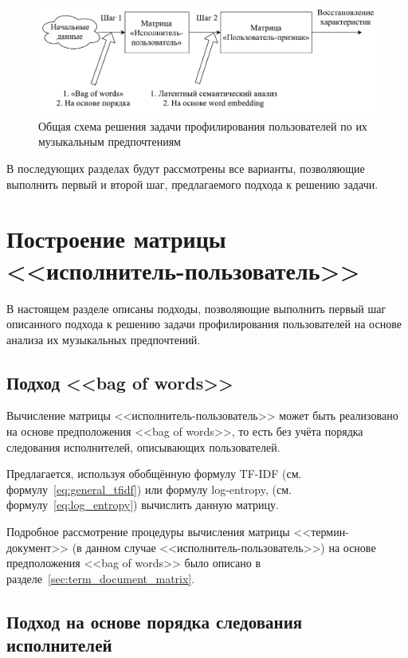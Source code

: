 \begin{figure}[!h]
\caption{Общая схема решения задачи профилирования пользователей
         по их музыкальным предпочтениям}
\label{fig:general_approach}
\centering
\includegraphics[width=\textwidth]{figs/general-approach.pdf}
\end{figure}

В последующих разделах будут рассмотрены все варианты,
позволяющие выполнить первый и второй шаг, предлагаемого
подхода к решению задачи.

\section{Построение матрицы <<исполнитель-пользователь>>}
\label{sec:step1_artist_user_matrix}

В настоящем разделе описаны подходы, позволяющие выполнить
первый шаг описанного подхода к решению задачи профилирования
пользователей на основе анализа их музыкальных предпочтений.

\subsection{Подход <<bag of words>>}

Вычисление матрицы <<исполнитель-пользователь>> может быть
реализовано на основе предположения <<bag of words>>, то есть
без учёта порядка следования исполнителей, описывающих пользователей.

Предлагается, используя обобщённую формулу TF-IDF 
(см. формулу~\ref{eq:general_tfidf}) или формулу log-entropy,
(см. формулу~\ref{eq:log_entropy}) вычислить данную матрицу.

Подробное рассмотрение процедуры вычисления матрицы <<термин-документ>>
(в данном случае <<исполнитель-пользователь>>) на основе
предположения <<bag of words>> было описано в 
разделе~\ref{sec:term_document_matrix}.

\subsection{Подход на основе порядка следования исполнителей}

